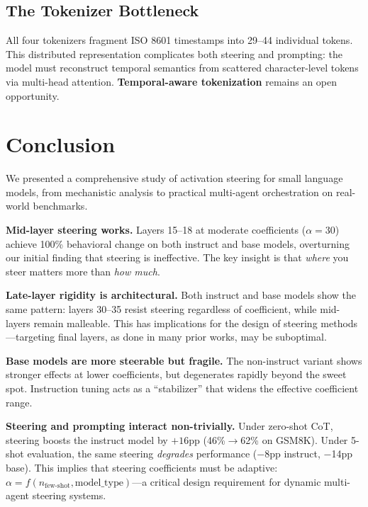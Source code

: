 \documentclass[11pt,a4paper]{article}
\begin{document}
\subsection{The Tokenizer Bottleneck}

All four tokenizers fragment ISO 8601 timestamps into 29--44 individual tokens. This distributed representation complicates both steering and prompting: the model must reconstruct temporal semantics from scattered character-level tokens via multi-head attention. \textbf{Temporal-aware tokenization} remains an open opportunity.

\section{Conclusion}

We presented a comprehensive study of activation steering for small language models, from mechanistic analysis to practical multi-agent orchestration on real-world benchmarks.

\textbf{Mid-layer steering works.} Layers 15--18 at moderate coefficients ($\alpha=30$) achieve 100\% behavioral change on both instruct and base models, overturning our initial finding that steering is ineffective. The key insight is that \textit{where} you steer matters more than \textit{how much}.

\textbf{Late-layer rigidity is architectural.} Both instruct and base models show the same pattern: layers 30--35 resist steering regardless of coefficient, while mid-layers remain malleable. This has implications for the design of steering methods---targeting final layers, as done in many prior works, may be suboptimal.

\textbf{Base models are more steerable but fragile.} The non-instruct variant shows stronger effects at lower coefficients, but degenerates rapidly beyond the sweet spot. Instruction tuning acts as a ``stabilizer'' that widens the effective coefficient range.

\textbf{Steering and prompting interact non-trivially.} Under zero-shot CoT, steering boosts the instruct model by $+16$pp (46\%$\to$62\% on GSM8K). Under 5-shot evaluation, the same steering \textit{degrades} performance ($-$8pp instruct, $-$14pp base). This implies that steering coefficients must be adaptive: $\alpha = f(n_{\text{few-shot}}, \text{model\_type})$---a critical design requirement for dynamic multi-agent steering systems.
\end{document}
